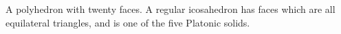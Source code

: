 A polyhedron with twenty faces. A regular icosahedron has faces which are all
equilateral triangles, and is one of the five Platonic solids.